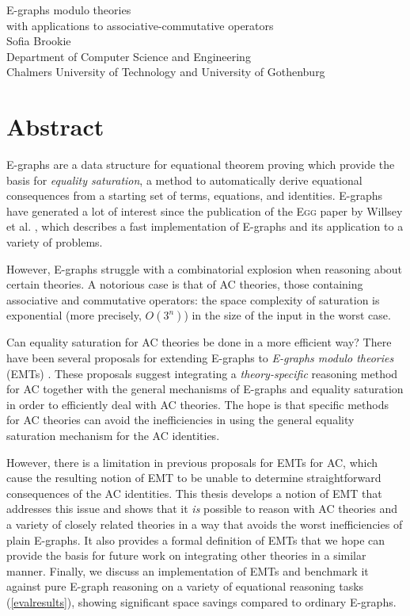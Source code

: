 \documentclass[12pt,a4paper,twoside,openright]{report}
\numberwithin{equation}{chapter}		%
\numberwithin{figure}{chapter}			%
\numberwithin{table}{chapter}			%
\theoremstyle{definition}
\theoremstyle{plain}
\newcommand{\oneLineTitle}{E-graphs modulo theories}
\newcommand{\oneLineSubtitle}{with applications to associative-commutative operators}
\begin{document}
\listoffixmes

\newpage
\oneLineTitle\\
\oneLineSubtitle\\
Sofia Brookie\\
Department of Computer Science and Engineering\\
Chalmers University of Technology and University of Gothenburg

\thispagestyle{plain}			%
\section*{Abstract}

E-graphs are a data structure for equational theorem proving which provide the basis for \emph{equality saturation}, a method to automatically derive equational consequences from a starting set of terms, equations, and identities. E-graphs have generated a lot of interest since the publication of the \textsc{Egg} paper by Willsey et al. \cite{willsey_egg_2021}, which describes a fast implementation of E-graphs and its application to a variety of problems.

However, E-graphs struggle with a combinatorial explosion when reasoning about certain theories. A notorious case is that of AC theories, those containing associative and commutative operators: the space complexity of saturation is exponential (more precisely, $O(3^n)$) in the size of the input in the worst case.

Can equality saturation for AC theories be done in a more efficient way? There have been several proposals for extending E-graphs to \emph{E-graphs modulo theories} (EMTs) \cite{zucker_omelets_2025, panchekha_lin-graphs_2025, shanabrook_custom_2026}.  These proposals suggest integrating a \emph{theory-specific} reasoning method for AC together with the general mechanisms of E-graphs and equality saturation in order to efficiently deal with AC theories. The hope is that specific methods for AC theories can avoid the inefficiencies in using the general equality saturation mechanism for the AC identities.

However, there is a limitation in previous proposals for EMTs for AC, which cause the resulting notion of EMT to be unable to determine straightforward consequences of the AC identities. This thesis develops a notion of EMT that addresses this issue and shows that it \emph{is} possible to reason with AC theories and a variety of closely related theories in a way that avoids the worst inefficiencies of plain E-graphs. It also provides a formal definition of EMTs that we hope can provide the basis for future work on integrating other theories in a similar manner. Finally, we discuss an implementation of EMTs and benchmark it against pure E-graph reasoning on a variety of equational reasoning tasks (\ref{evalresults}), showing significant space savings compared to ordinary E-graphs.
\end{document}
